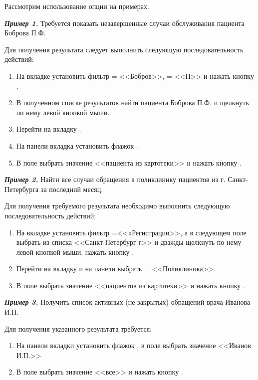 Рассмотрим использование опции  на примерах.

\textbf{\textit{Пример 1.}} Требуется показать незавершенные случаи обслуживания пациента Боброва П.Ф.

Для получения результата следует выполнить следующую последовательность действий:
\begin{enumerate}
 \item На вкладке  установить фильтр  = <<Бобров>>,  = <<П>> и нажать кнопку .
 \item В полученном списке результатов найти пациента Боброва П.Ф. и щелкнуть по нему левой кнопкой мыши.
 \item Перейти на вкладку .
 \item На панели  вкладка  установить флажок .
 \item В поле  выбрать значение <<пациента из картотеки>> и нажать кнопку .
\end{enumerate}
 
\textbf{\textit{Пример 2.}} Найти все случаи обращения в поликлинику пациентов из г. Санкт-Петербурга за последний месяц.

Для получения требуемого результата необходимо выполнить следующую последовательность действий:
\begin{enumerate}
 \item На вкладке  установить фильтр  =<<«Регистрации>>, а в следующем поле выбрать из списка <<Санкт-Петербург г>> и дважды щелкнуть по нему левой кнопкой мыши, нажать кнопку .
 \item Перейти на вкладку  и на панели  выбрать  = <<Поликлиника>>.
 \item В поле  выбрать значение <<пациентов из картотеки>> и нажать кнопку .
\end{enumerate}
 
\textbf {\textit {Пример 3.}} Получить список активных (не закрытых) обращений врача Иванова И.П.

Для получения указанного результата требуется:
\begin{enumerate}
 \item На панели  вкладки  установить флажок , в поле  выбрать значение <<Иванов И.П.>>
 \item В поле  выбрать значение <<все>> и нажать кнопку .
\end{enumerate}

